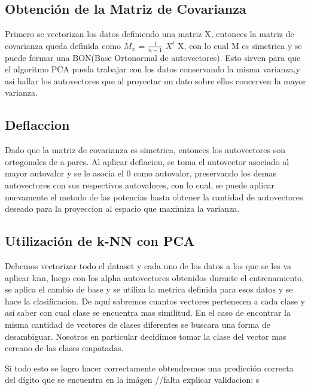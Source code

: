 \subsection{Obtención de la Matriz de Covarianza}
Primero se vectorizan los datos definiendo una matriz X, entonces la matriz de
covarianza queda definida como $M_{x}$ = $\frac{1}{n-1}$ $X^{t}$ X, con lo cual
M es simetrica y se puede formar una BON(Base Ortonormal de autovectores). Esto sirven
para que el algoritmo PCA pueda trabajar con los datos conservando la misma varianza,y asi hallar los autovectores que al proyectar un dato sobre
ellos concerven la mayor varianza.

\subsection{Deflaccion}
Dado que la matriz de covarianza es simetrica, entonces los autovectores son ortogonales de a pares. Al aplicar deflacion, se toma el autovector asociado al mayor autovalor y se le asocia el 0 como autovalor, preservando los demas autovectores con sus respectivos autovalores, con lo cual, se puede aplicar nuevamente el metodo de las potencias hasta obtener la cantidad de autovectores deseado para la proyeccion al espacio que maximiza la varianza.

\subsection{Utilización de k-NN con PCA}

Debemos vectorizar todo el dataset y cada uno de los
datos a los que se les va aplicar knn, luego con los alpha autovectores
obtenidos durante el entrenamiento, se aplica el cambio de base y se utiliza la
metrica definida para esos datos y se hace la clasificacion. De aquí sabremos cuantos vectores pertenecen a cada clase y así saber con cual clase se encuentra mas similitud. En el caso de encontrar la misma cantidad de vectores de clases diferentes se buscara una forma de desambiguar. Nosotros en particular decidimos tomar la clase del vector mas cercano de las clases empatadas.

Si todo esto se logro hacer correctamente obtendremos una predicción correcta
del dígito que se encuentra en la imágen
//falta explicar validacion: s 